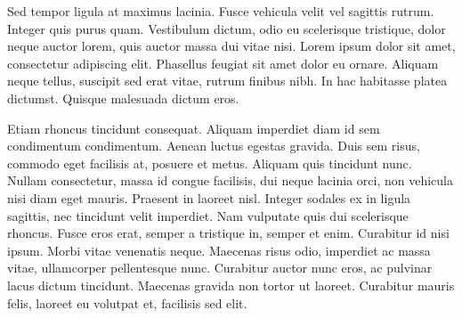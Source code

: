 Sed tempor ligula at maximus lacinia. Fusce vehicula velit vel sagittis rutrum. Integer quis purus quam. Vestibulum dictum, odio eu scelerisque tristique, dolor neque auctor lorem, quis auctor massa dui vitae nisi. Lorem ipsum dolor sit amet, consectetur adipiscing elit. Phasellus feugiat sit amet dolor eu ornare. Aliquam neque tellus, suscipit sed erat vitae, rutrum finibus nibh. In hac habitasse platea dictumst. Quisque malesuada dictum eros.

Etiam rhoncus tincidunt consequat. Aliquam imperdiet diam id sem condimentum condimentum. Aenean luctus egestas gravida. Duis sem risus, commodo eget facilisis at, posuere et metus. Aliquam quis tincidunt nunc. Nullam consectetur, massa id congue facilisis, dui neque lacinia orci, non vehicula nisi diam eget mauris. Praesent in laoreet nisl. Integer sodales ex in ligula sagittis, nec tincidunt velit imperdiet. Nam vulputate quis dui scelerisque rhoncus. Fusce eros erat, semper a tristique in, semper et enim. Curabitur id nisi ipsum. Morbi vitae venenatis neque. Maecenas risus odio, imperdiet ac massa vitae, ullamcorper pellentesque nunc. Curabitur auctor nunc eros, ac pulvinar lacus dictum tincidunt. Maecenas gravida non tortor ut laoreet. Curabitur mauris felis, laoreet eu volutpat et, facilisis sed elit.
